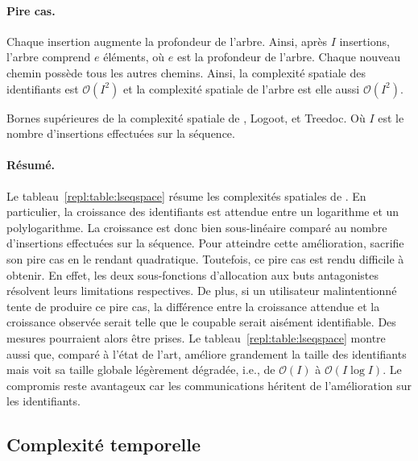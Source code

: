 \paragraph{Pire cas.} Chaque insertion augmente la profondeur de l'arbre. Ainsi,
après $I$ insertions, l'arbre comprend $e$ éléments, où $e$ est la profondeur de
l'arbre. Chaque nouveau chemin possède tous les autres chemins. Ainsi, la
complexité spatiale des identifiants est $\mathcal{O}(I^2)$ et la complexité
spatiale de l'arbre est elle aussi $\mathcal{O}(I^2)$.

\begin{table}
  \begin{center}
    \caption{\label{repl:table:lseqspace}
      Bornes supérieures de la complexité spatiale de \LSEQ, Logoot, et Treedoc. Où
      $I$ est le nombre d'insertions effectuées sur la séquence.}
    
  \end{center}
\end{table}

\paragraph{Résumé.} Le tableau~\ref{repl:table:lseqspace} résume les complexités
spatiales de \LSEQ. En particulier, la croissance des identifiants est attendue
entre un logarithme et un polylogarithme. La croissance est donc bien
sous-linéaire comparé au nombre d'insertions effectuées sur la séquence. Pour
atteindre cette amélioration, \LSEQ sacrifie son pire cas en le rendant
quadratique. Toutefois, ce pire cas est rendu difficile à obtenir. En effet, les
deux sous-fonctions d'allocation aux buts antagonistes résolvent leurs
limitations respectives. De plus, si un utilisateur malintentionné tente de
produire ce pire cas, la différence entre la croissance attendue et la
croissance observée serait telle que le coupable serait aisément
identifiable. Des mesures pourraient alors être prises. Le
tableau~\ref{repl:table:lseqspace} montre aussi que, comparé à l'état de l'art,
\LSEQ améliore grandement la taille des identifiants mais voit sa taille globale
légèrement dégradée, i.e., de $\mathcal{O}(I)$ à $\mathcal{O}(I\log I)$. Le
compromis reste avantageux car les communications héritent de l'amélioration sur
les identifiants.

\subsection{Complexité temporelle}




